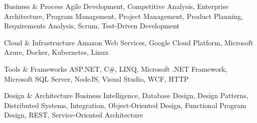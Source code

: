 


\begin{cvskills}


\cvskill
{Business \& Process}
{Agile Development, Competitive Analysis, Enterprise Architecture, Program Management, Project Management, Product Planning, Requirements Analysis, Scrum, Test-Driven Development}


\cvskill
{Cloud \& Infrastructure}
{Amazon Web Services, Google Cloud Platform, Microsoft Azure, Docker, Kubernetes, Linux}


\cvskill
{Tools \& Frameworks}
{ASP.NET, C\#, LINQ, Microsoft .NET Framework, Microsoft SQL Server, NodeJS, Visual Studio, WCF, HTTP}


\cvskill
{Design \& Architecture}
{Business Intelligence, Database Design, Design Patterns, Distributed Systems, Integration, Object-Oriented Design, Functional Program Design, REST, Service-Oriented Architecture}


\end{cvskills}